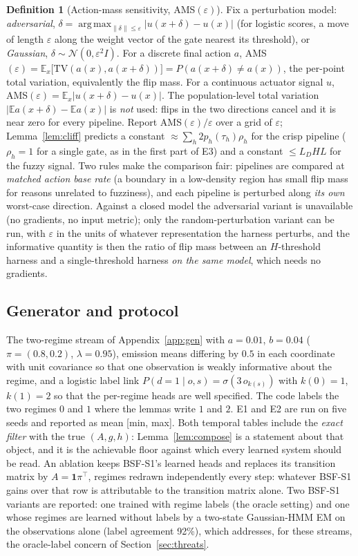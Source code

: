\documentclass[11pt,a4paper]{article}
\numberwithin{equation}{section}
\theoremstyle{plain}
\theoremstyle{definition}
\newtheorem{definition}{Definition}
\theoremstyle{remark}
\newcommand{\E}{\mathbb{E}}
\newcommand{\norm}[1]{\lVert #1 \rVert}
\DeclareMathOperator*{\argmax}{arg\,max}
\begin{document}
\begin{definition}[Action-mass sensitivity, AMS$(\varepsilon)$]
Fix a perturbation model: \emph{adversarial}, $\delta=\argmax_{\norm{\delta}\le\varepsilon}|u(x+\delta)-u(x)|$ (for logistic scores, a move of length $\varepsilon$ along the weight vector of the gate nearest its threshold), or \emph{Gaussian}, $\delta\sim\mathcal N(0,\varepsilon^2I)$. For a discrete final action $a$, AMS$(\varepsilon)=\E_x\bigl[\mathrm{TV}(a(x),a(x+\delta))\bigr]=P(a(x+\delta)\ne a(x))$, the per-point total variation, equivalently the flip mass. For a continuous actuator signal $u$, AMS$(\varepsilon)=\E_x|u(x+\delta)-u(x)|$. The population-level total variation $|\E a(x+\delta)-\E a(x)|$ is \emph{not} used: flips in the two directions cancel and it is near zero for every pipeline. Report AMS$(\varepsilon)/\varepsilon$ over a grid of $\varepsilon$; Lemma~\ref{lem:cliff} predicts a constant $\approx\sum_h2p_h(\tau_h)\rho_h$ for the crisp pipeline ($\rho_h=1$ for a single gate, as in the first part of E3) and a constant $\le L_DHL$ for the fuzzy signal. Two rules make the comparison fair: pipelines are compared at \emph{matched action base rate} (a boundary in a low-density region has small flip mass for reasons unrelated to fuzziness), and each pipeline is perturbed along \emph{its own} worst-case direction. Against a closed model the adversarial variant is unavailable (no gradients, no input metric); only the random-perturbation variant can be run, with $\varepsilon$ in the units of whatever representation the harness perturbs, and the informative quantity is then the ratio of flip mass between an $H$-threshold harness and a single-threshold harness \emph{on the same model}, which needs no gradients.
\end{definition}

\subsection{Generator and protocol}
The two-regime stream of Appendix~\ref{app:gen} with $a=0.01$, $b=0.04$ ($\pi=(0.8,0.2)$, $\lambda=0.95$), emission means differing by $0.5$ in each coordinate with unit covariance so that one observation is weakly informative about the regime, and a logistic label link $P(d=1\mid o,s)=\sigma(3\,o_{k(s)})$ with $k(0)=1$, $k(1)=2$ so that the per-regime heads are well specified. The code labels the two regimes $0$ and $1$ where the lemmas write $1$ and $2$. E1 and E2 are run on five seeds and reported as mean [min, max]. Both temporal tables include the \emph{exact filter} with the true $(A,g,h)$: Lemma~\ref{lem:compose} is a statement about that object, and it is the achievable floor against which every learned system should be read. An ablation keeps BSF-S1's learned heads and replaces its transition matrix by $A=\mathbf 1\pi^\top$, regimes redrawn independently every step: whatever BSF-S1 gains over that row is attributable to the transition matrix alone. Two BSF-S1 variants are reported: one trained with regime labels (the oracle setting) and one whose regimes are learned without labels by a two-state Gaussian-HMM EM on the observations alone (label agreement 92\%), which addresses, for these streams, the oracle-label concern of Section~\ref{sec:threats}.
\end{document}
